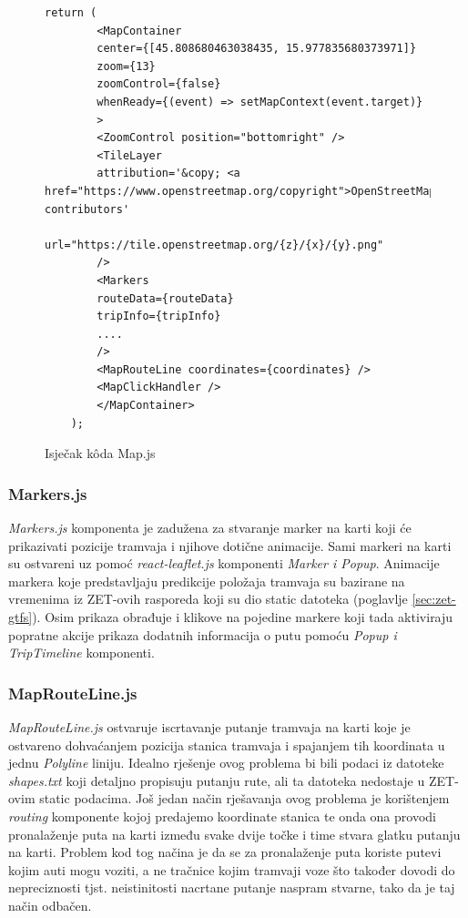 \documentclass[zavrsnirad]{fer}
\begin{document}
\begin{figure}[H]
	\centering
	\begin{minipage}{0.9\linewidth}
		\begin{lstlisting}[language=JSX]
	return (
		<MapContainer
		center={[45.808680463038435, 15.977835680373971]}
		zoom={13}
		zoomControl={false}
		whenReady={(event) => setMapContext(event.target)}
		>
		<ZoomControl position="bottomright" />
		<TileLayer
		attribution='&copy; <a href="https://www.openstreetmap.org/copyright">OpenStreetMap</a> contributors'
		url="https://tile.openstreetmap.org/{z}/{x}/{y}.png"
		/>
		<Markers
		routeData={routeData}
		tripInfo={tripInfo}
		....
		/>
		<MapRouteLine coordinates={coordinates} />
		<MapClickHandler />
		</MapContainer>
	);
		\end{lstlisting}
	\end{minipage}
	\caption{Isječak k\^oda Map.js}
	\label{slk:mapjs}
\end{figure}

\subsubsection{Markers.js}
\textit{Markers.js} komponenta je zadužena za stvaranje marker na karti koji će prikazivati pozicije tramvaja i njihove dotične animacije. Sami markeri na karti su ostvareni uz pomoć \textit{react-leaflet.js} komponenti \textit{Marker i Popup}. Animacije markera koje predstavljaju predikcije položaja tramvaja su bazirane na vremenima iz ZET-ovih rasporeda koji su dio static datoteka (poglavlje \ref{sec:zet-gtfs}). Osim prikaza obrađuje i klikove na pojedine markere koji tada aktiviraju popratne akcije prikaza dodatnih informacija o putu pomoću \textit{Popup i TripTimeline} komponenti.

\subsubsection{MapRouteLine.js}
\textit{MapRouteLine.js} ostvaruje iscrtavanje putanje tramvaja na karti koje je ostvareno dohvaćanjem pozicija stanica tramvaja i spajanjem tih koordinata u jednu \textit{Polyline} liniju. Idealno rješenje ovog problema bi bili podaci iz datoteke \textit{shapes.txt} koji detaljno propisuju putanju rute, ali ta datoteka nedostaje u ZET-ovim static podacima.
Još jedan način rješavanja ovog problema je korištenjem \textit{routing} komponente kojoj predajemo koordinate stanica te onda ona provodi pronalaženje puta na karti između svake dvije točke i time stvara glatku putanju na karti. Problem kod tog načina je da se za pronalaženje puta koriste putevi kojim auti mogu voziti, a ne tračnice kojim tramvaji voze što također dovodi do nepreciznosti tjst. neistinitosti nacrtane putanje naspram stvarne, tako da je taj način odbačen.
\end{document}
